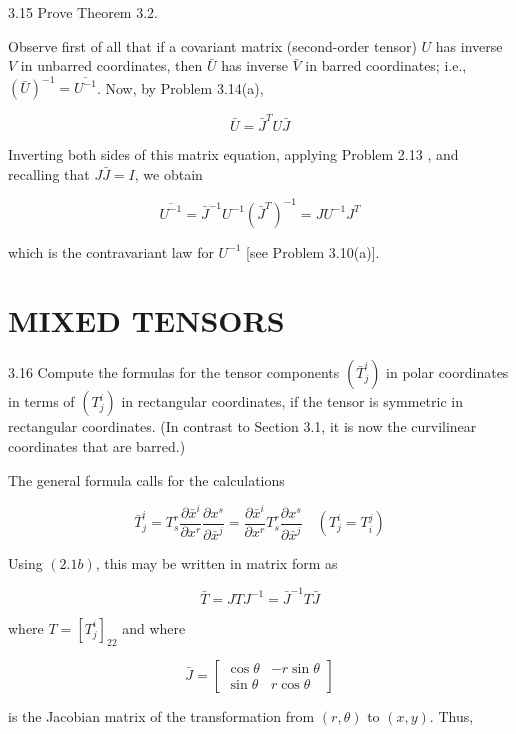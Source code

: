 \documentclass[10pt]{article}
\begin{document}
3.15 Prove Theorem 3.2.

Observe first of all that if a covariant matrix (second-order tensor) $U$ has inverse $V$ in unbarred coordinates, then $\bar{U}$ has inverse $\bar{V}$ in barred coordinates; i.e., $(\bar{U})^{-1}=\overline{U^{-1}}$. Now, by Problem 3.14(a),

$$
\bar{U}=\bar{J}^{T} U \bar{J}
$$

Inverting both sides of this matrix equation, applying Problem 2.13 , and recalling that $J \bar{J}=I$, we obtain

$$
\overline{U^{-1}}=\bar{J}^{-1} U^{-1}\left(\bar{J}^{T}\right)^{-1}=J U^{-1} J^{T}
$$

which is the contravariant law for $U^{-1}$ [see Problem 3.10(a)].

\section*{MIXED TENSORS}
3.16 Compute the formulas for the tensor components $\left(\bar{T}_{j}^{i}\right)$ in polar coordinates in terms of $\left(T_{j}^{i}\right)$ in rectangular coordinates, if the tensor is symmetric in rectangular coordinates. (In contrast to Section 3.1, it is now the curvilinear coordinates that are barred.)

The general formula calls for the calculations

$$
\bar{T}_{j}^{i}=T_{s}^{r} \frac{\partial \bar{x}^{i}}{\partial x^{r}} \frac{\partial x^{s}}{\partial \bar{x}^{j}}=\frac{\partial \bar{x}^{i}}{\partial x^{r}} T_{s}^{r} \frac{\partial x^{s}}{\partial \bar{x}^{j}} \quad\left(T_{j}^{i}=T_{i}^{j}\right)
$$

Using $(2.1 b)$, this may be written in matrix form as


\begin{equation*}
\bar{T}=J T J^{-1}=\bar{J}^{-1} T \bar{J} \tag{1}
\end{equation*}


where $T=\left[T_{j}^{i}\right]_{22}$ and where

$$
\bar{J}=\left[\begin{array}{cc}
\cos \theta & -r \sin \theta \\
\sin \theta & r \cos \theta
\end{array}\right]
$$

is the Jacobian matrix of the transformation from $(r, \theta)$ to $(x, y)$. Thus,
\end{document}
